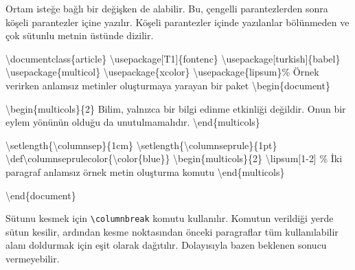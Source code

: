\documentclass[
  letterpaper,
  DIV=11,
  numbers=noendperiod]{scrreprt}
\newenvironment{Shaded}{\begin{snugshade}}{\end{snugshade}}
\newcommand{\BuiltInTok}[1]{\textcolor[rgb]{0.00,0.23,0.31}{#1}}
\newcommand{\CommentTok}[1]{\textcolor[rgb]{0.37,0.37,0.37}{#1}}
\newcommand{\ExtensionTok}[1]{\textcolor[rgb]{0.00,0.23,0.31}{#1}}
\newcommand{\FunctionTok}[1]{\textcolor[rgb]{0.28,0.35,0.67}{#1}}
\newcommand{\KeywordTok}[1]{\textcolor[rgb]{0.00,0.23,0.31}{#1}}
\newcommand{\NormalTok}[1]{\textcolor[rgb]{0.00,0.23,0.31}{#1}}
\begin{document}
Ortam isteğe bağlı bir değişken de alabilir. Bu, çengelli parantezlerden
sonra köşeli parantezler içine yazılır. Köşeli parantezler içinde
yazılanlar bölünmeden ve çok sütunlu metnin üstünde dizilir.

\begin{Shaded}
\begin{Highlighting}[]
\BuiltInTok{\textbackslash{}documentclass}\NormalTok{\{}\ExtensionTok{article}\NormalTok{\}}
\BuiltInTok{\textbackslash{}usepackage}\NormalTok{[T1]\{}\ExtensionTok{fontenc}\NormalTok{\}}
\BuiltInTok{\textbackslash{}usepackage}\NormalTok{[turkish]\{}\ExtensionTok{babel}\NormalTok{\}}
\BuiltInTok{\textbackslash{}usepackage}\NormalTok{\{}\ExtensionTok{multicol}\NormalTok{\}}
\BuiltInTok{\textbackslash{}usepackage}\NormalTok{\{}\ExtensionTok{xcolor}\NormalTok{\}}
\BuiltInTok{\textbackslash{}usepackage}\NormalTok{\{}\ExtensionTok{lipsum}\NormalTok{\}}\CommentTok{\% Örnek verirken anlamsız metinler oluşturmaya yarayan bir paket}
\KeywordTok{\textbackslash{}begin}\NormalTok{\{}\ExtensionTok{document}\NormalTok{\}}

\KeywordTok{\textbackslash{}begin}\NormalTok{\{}\ExtensionTok{multicols}\NormalTok{\}\{2\}}
\NormalTok{  Bilim, yalnızca bir bilgi edinme etkinliği değildir. Onun bir}
\NormalTok{  eylem yönünün olduğu da unutulmamalıdır.}
\KeywordTok{\textbackslash{}end}\NormalTok{\{}\ExtensionTok{multicols}\NormalTok{\}}

\FunctionTok{\textbackslash{}setlength}\NormalTok{\{}\FunctionTok{\textbackslash{}columnsep}\NormalTok{\}\{1cm\}}
\FunctionTok{\textbackslash{}setlength}\NormalTok{\{}\FunctionTok{\textbackslash{}columnseprule}\NormalTok{\}\{1pt\}}
\FunctionTok{\textbackslash{}def\textbackslash{}columnseprulecolor}\NormalTok{\{}\FunctionTok{\textbackslash{}color}\NormalTok{\{blue\}\}}
\KeywordTok{\textbackslash{}begin}\NormalTok{\{}\ExtensionTok{multicols}\NormalTok{\}\{2\}}
  \FunctionTok{\textbackslash{}lipsum}\NormalTok{[1{-}2] }\CommentTok{\% İki paragraf anlamsız örnek metin oluşturma komutu}
\KeywordTok{\textbackslash{}end}\NormalTok{\{}\ExtensionTok{multicols}\NormalTok{\}}


\KeywordTok{\textbackslash{}end}\NormalTok{\{}\ExtensionTok{document}\NormalTok{\}}
\end{Highlighting}
\end{Shaded}

Sütunu kesmek için \texttt{\textbackslash{}columnbreak} komutu
kullanılır. Komutun verildiği yerde sütun kesilir, ardından kesme
noktasından önceki paragraflar tüm kullanılabilir alanı doldurmak için
eşit olarak dağıtılır. Dolayısıyla bazen beklenen sonucu vermeyebilir.
\end{document}
